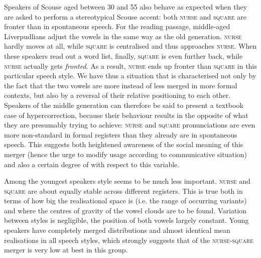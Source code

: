 Speakers of Scouse aged between 30 and 55 also behave as expected when they are asked to perform a stereotypical Scouse accent: both \textsc{nurse} and \textsc{square} are fronter than in spontaneous speech.
For the reading passage, middle-aged Liverpudlians adjust the vowels in the same way as the old generation.
\textsc{nurse} hardly moves at all, while \textsc{square} is centralised and thus approaches \textsc{nurse}.
When these speakers read out a word list, finally, \textsc{square} is even further back, while \textsc{nurse} actually gets \emph{fronted}.
As a result, \textsc{nurse} ends up fronter than \textsc{square} in this particular speech style.
We have thus a situation that is characterised not only by the fact that the two vowels are more instead of less merged in more formal contexts, but also by a reversal of their relative positioning to each other.
Speakers of the middle generation can therefore be said to present a textbook case of hypercorrection, because their behaviour results in the opposite of what they are presumably trying to achieve: \textsc{nurse} and \textsc{square} pronunciations are even more non-standard in formal registers than they already are in spontaneous speech.
This suggests both heightened awareness of the social meaning of this merger (hence the urge to modify usage according to communicative situation) and also a certain degree of  with respect to this variable.

Among the youngest speakers style seems to be much less important.
\textsc{nurse} and \textsc{square} are about equally stable across different registers.
This is true both in terms of how big the realisational space is (i.e. the range of occurring variants) and where the centres of gravity of the vowel clouds are to be found.
Variation between styles is negligible, the position of both vowels largely constant.
Young speakers have completely merged distributions and almost identical mean realisations in all speech styles, which strongly suggests that  of the \textsc{nurse}-\textsc{square} merger is very low at best in this group.

